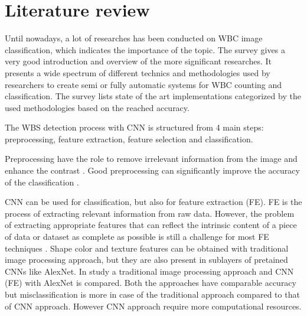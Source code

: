 \section{Literature review}
Until nowadays, a lot of researches has been conducted on WBC image classification, which indicates the importance of the topic.
The \cite{b7} survey gives a very good introduction and overview of the more significant researches. It presents a wide spectrum of different technics and methodologies used by researchers to create semi or fully automatic systems for WBC counting and classification. The survey lists state of the art implementations categorized by the used methodologies based on the reached accuracy.

The WBS detection process with CNN is structured from 4 main steps: preprocessing, feature extraction, feature selection and classification.

Preprocessing have the role to remove irrelevant information from the image and enhance the contrast 
. Good preprocessing can significantly improve the accuracy of the classification 
.

CNN can be used for classification, but also for feature extraction (FE). FE is the process of extracting relevant information from raw data. However, the problem of extracting appropriate features that can reflect the intrinsic content of a piece of data or dataset as complete as possible is still a challenge for most FE techniques
. Shape color and texture features can be obtained with traditional image processing approach, but they are also present in sublayers of pretained CNNs like AlexNet.
In 
study a traditional image processing approach and CNN (FE) with AlexNet is compared. Both the approaches have comparable accuracy but misclassification is more in case of the traditional approach compared to that of CNN approach. However
 CNN approach require more computational resources.

